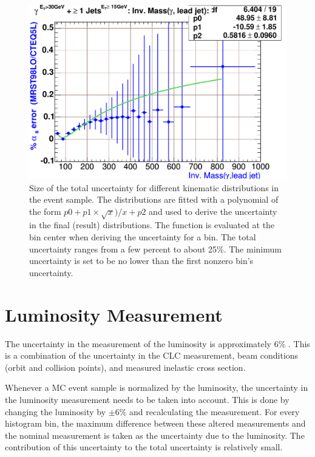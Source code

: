 \begin{figure}[h!]
 \includegraphics[scale=0.36,keepaspectratio=true]{AlphaS_systpj1_InvM_phojet.pdf}
 \caption{Size of the total \alphas uncertainty for different kinematic distributions in the \phoonejet event sample. The distributions are fitted with a polynomial of the form $p0+p1 \times \sqrt{x})/x+p2$ and used to derive the uncertainty in the final (result) distributions. The function is evaluated at the bin center when deriving the uncertainty for a bin. The total uncertainty ranges from a few percent to about 25\%. The minimum uncertainty is set to be no lower than the first nonzero bin's uncertainty.}
 \label{fig:AlphaS_Syst}
\end{figure}

\section{Luminosity Measurement}
The uncertainty in the measurement of the luminosity is approximately 6\% \cite{www:CLCuncertainty}. This is a combination of the uncertainty in the CLC measurement, beam conditions (orbit and collision points), and measured inelastic cross section.

Whenever a MC event sample is normalized by the luminosity, the uncertainty in the luminosity measurement needs to be taken into account. This is done by changing the luminosity by $\pm 6\%$ and recalculating the measurement. For every histogram bin, the maximum difference between these altered measurements and the nominal measurement is taken as the uncertainty due to the luminosity. The contribution of this uncertainty to the total uncertainty is relatively small.

